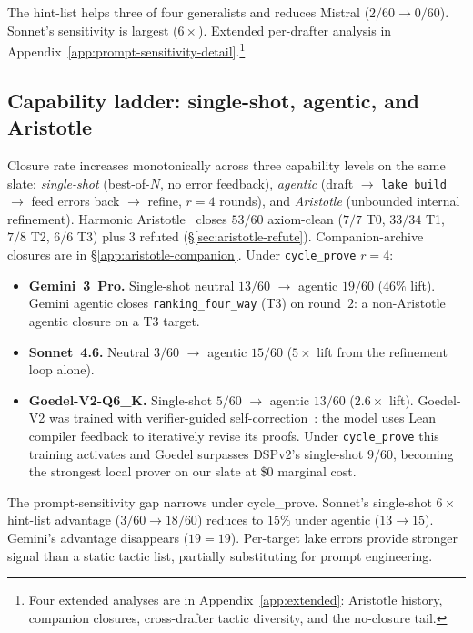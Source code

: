 The hint-list helps three of four generalists and reduces
Mistral ($2/60 \to 0/60$). Sonnet's sensitivity is largest
($6\times$). Extended per-drafter analysis in
Appendix~\ref{app:prompt-sensitivity-detail}.\footnote{Four
extended analyses are in Appendix~\ref{app:extended}: Aristotle
history, companion closures, cross-drafter tactic diversity, and
the no-closure tail.}


\subsection{Capability ladder: single-shot, agentic, and Aristotle}
\label{sec:agentic}

Closure rate increases monotonically across three capability levels
on the same slate: \emph{single-shot} (best-of-$N$, no error
feedback), \emph{agentic} (draft $\to$ \texttt{lake build} $\to$
feed errors back $\to$ refine, $r{=}4$ rounds), and
\emph{Aristotle} (unbounded internal refinement). Harmonic
Aristotle~\cite{aristotle2025} closes $53/60$ axiom-clean ($7/7$
T0, $33/34$ T1, $7/8$ T2, $6/6$ T3) plus $3$ refuted
(\S\ref{sec:aristotle-refute}). Companion-archive closures are
in \S\ref{app:aristotle-companion}. Under \texttt{cycle\_prove}
$r{=}4$:

\begin{itemize}[leftmargin=1.3em, itemsep=0.15em]
\item \textbf{Gemini~3~Pro.} Single-shot neutral $13/60$ $\to$
  agentic $19/60$ ($46\%$ lift). Gemini agentic closes
  \texttt{ranking\_four\_way} (T3) on round~$2$: a
  non-Aristotle agentic closure on a T3 target.
\item \textbf{Sonnet~4.6.} Neutral $3/60$ $\to$ agentic $15/60$
  ($5\times$ lift from the refinement loop alone).
\item \textbf{Goedel-V2-Q6\_K.} Single-shot $5/60$ $\to$ agentic
  $13/60$ ($2.6\times$ lift). Goedel-V2 was trained with
  verifier-guided self-correction~\cite{goedelprover2025}: the
  model uses Lean compiler feedback to iteratively revise its
  proofs. Under \texttt{cycle\_prove} this training activates and
  Goedel surpasses DSPv2's single-shot $9/60$, becoming the
  strongest local prover on our slate at \$0 marginal cost.
\end{itemize}

The prompt-sensitivity gap narrows under cycle\_prove. Sonnet's
single-shot $6\times$ hint-list advantage ($3/60 \to 18/60$) reduces
to $15\%$ under agentic ($13 \to 15$). Gemini's advantage disappears
($19 = 19$). Per-target lake errors provide stronger signal than a
static tactic list, partially substituting for prompt engineering.

